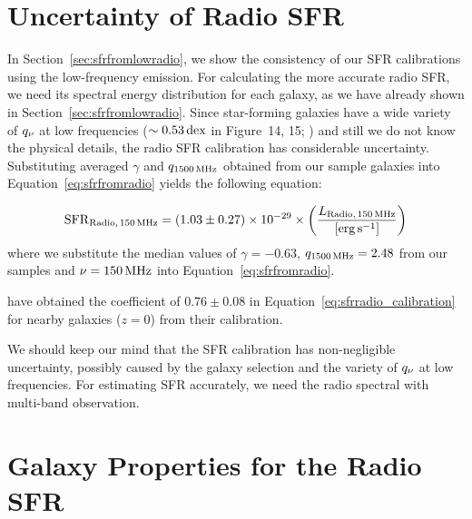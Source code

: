 \section{Uncertainty of Radio SFR}\label{sec:radiosfruncertainty}

In Section~\ref{sec:sfrfromlowradio}, we show the consistency of our SFR calibrations using the low-frequency emission.
For calculating the more accurate radio SFR, we need its spectral energy distribution for each galaxy, as we have already shown in Section~\ref{sec:sfrfromlowradio}.
Since star-forming galaxies have a wide variety of $q_{\nu}$ at low frequencies ($\sim 0.53\,\mathrm{dex}$ in Figure~14, 15; \citealt{CalistroRivera2017a}) and still we do not know the physical details, the radio SFR calibration has considerable uncertainty.
Substituting averaged $\gamma$ and $q_{\mathrm{1500\,\mathrm{MHz}}}$ obtained from our sample galaxies into Equation~\ref{eq:sfrfromradio} yields the following equation:

\begin{equation}\label{eq:sfrradio_calibration}
    \mathrm{SFR}_{\mathrm{Radio},\,150\,\mathrm{MHz}} = \left(1.03\pm0.27\right) \times 10^{-29} \times \left(\frac{L_{\mathrm{Radio},\,150\,\mathrm{MHz}}}{\left[\mathrm{erg}\,\mathrm{s}^{-1}\right]}\right)
\end{equation}
where we substitute the median values of $\gamma=-0.63$, $q_{\mathrm{1500\,\mathrm{MHz}}}=2.48$ from our samples and $\nu=150\,\mathrm{MHz}$ into Equation~\ref{eq:sfrfromradio}.

\citet{CalistroRivera2017a} have obtained the coefficient of $0.76 \pm 0.08$ in Equation~\ref{eq:sfrradio_calibration} for nearby galaxies ($z = 0$) from their calibration.

We should keep our mind that the SFR calibration has non-negligible uncertainty, possibly caused by the galaxy selection and the variety of $q_{\nu}$ at low frequencies.
For estimating SFR accurately, we need the radio spectral with multi-band observation.



\section{Galaxy Properties for the Radio SFR}\label{sec:galaxypropertiesfortheradiosfr}

